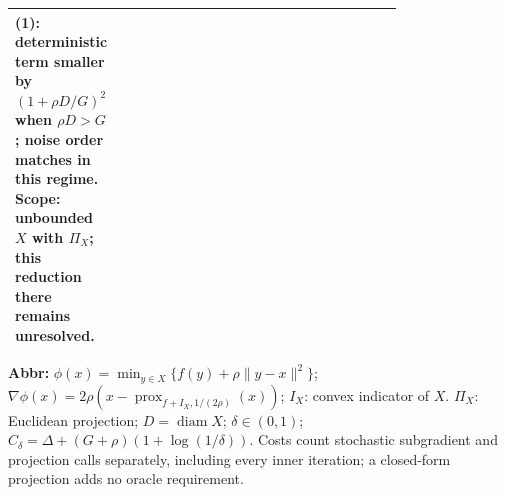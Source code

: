 \begin{table}[tp]
\begin{threeparttable}
\begin{tabularx}{\linewidth}{@{}>{\raggedright\arraybackslash}p{0.20\linewidth}>{\raggedright\arraybackslash}p{0.32\linewidth}>{\raggedright\arraybackslash}p{0.25\linewidth}>{\raggedright\arraybackslash}X@{}}
\textbf{(1)}: deterministic term smaller by $(1+\rho D/G)^2$ when $\rho D>G$; noise order matches in this regime. Scope: unbounded $X$ with $\Pi_X$; this reduction there remains unresolved. & \\
\bottomrule
\end{tabularx}
\begin{tablenotes}[flushleft]\footnotesize
\item[] \textbf{Abbr:} $\phi(x)=\min_{y\in X}\{f(y)+\rho\|y-x\|^2\}$; $\nabla\phi(x)=2\rho(x-\operatorname{prox}_{f+I_X,1/(2\rho)}(x))$; $I_X$: convex indicator of $X$. $\Pi_X$: Euclidean projection; $D=\operatorname{diam}X$; $\delta\in(0,1)$; $C_\delta=\Delta+(G+\rho)(1+\log(1/\delta))$. Costs count stochastic subgradient and projection calls separately, including every inner iteration; a closed-form projection adds no oracle requirement.
\end{tablenotes}
\end{threeparttable}
\end{table}
\clearpage
